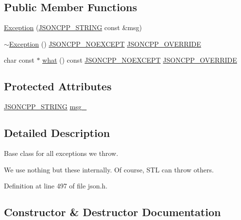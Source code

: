 \subsection*{Public Member Functions}
\begin{DoxyCompactItemize}
\item 
\hyperlink{class_json_1_1_exception_ae764aa42e0755bd4ce9d303e2733fa8f}{Exception} (\hyperlink{json_8h_a1e723f95759de062585bc4a8fd3fa4be}{J\+S\+O\+N\+C\+P\+P\+\_\+\+S\+T\+R\+I\+NG} const \&msg)
\item 
\hyperlink{class_json_1_1_exception_add6af5e0ecdf36f40d7f3554b9786e21}{$\sim$\+Exception} () \hyperlink{json_8h_af8418c6d82d9de6e5f3c739fcf2fe88d}{J\+S\+O\+N\+C\+P\+P\+\_\+\+N\+O\+E\+X\+C\+E\+PT} \hyperlink{json_8h_a824d6199c91488107e443226fa6022c5}{J\+S\+O\+N\+C\+P\+P\+\_\+\+O\+V\+E\+R\+R\+I\+DE}
\item 
char const  $\ast$ \hyperlink{class_json_1_1_exception_a70b7ce35e761fb93e8cd338e04619cd6}{what} () const \hyperlink{json_8h_af8418c6d82d9de6e5f3c739fcf2fe88d}{J\+S\+O\+N\+C\+P\+P\+\_\+\+N\+O\+E\+X\+C\+E\+PT} \hyperlink{json_8h_a824d6199c91488107e443226fa6022c5}{J\+S\+O\+N\+C\+P\+P\+\_\+\+O\+V\+E\+R\+R\+I\+DE}
\end{DoxyCompactItemize}
\subsection*{Protected Attributes}
\begin{DoxyCompactItemize}
\item 
\hyperlink{json_8h_a1e723f95759de062585bc4a8fd3fa4be}{J\+S\+O\+N\+C\+P\+P\+\_\+\+S\+T\+R\+I\+NG} \hyperlink{class_json_1_1_exception_aae3cbb8b45bf21480f64502a8329659f}{msg\+\_\+}
\end{DoxyCompactItemize}


\subsection{Detailed Description}
Base class for all exceptions we throw.

We use nothing but these internally. Of course, S\+TL can throw others. 

Definition at line 497 of file json.\+h.



\subsection{Constructor \& Destructor Documentation}
\mbox{\label{class_json_1_1_exception_ae764aa42e0755bd4ce9d303e2733fa8f}} 
